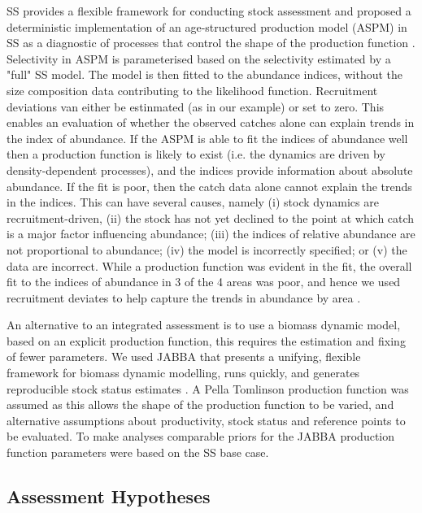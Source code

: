 \documentclass[12pt,halfline,a4paper,nonumbib]{ouparticle}
\begin{document}
SS provides a flexible framework for conducting stock assessment and \cite{maunder2015contemporary} proposed a deterministic implementation of an age-structured production model (ASPM) in SS as a diagnostic of processes that control the shape of the production function \parencite{carvalho2017can}. Selectivity in ASPM is parameterised based on the selectivity estimated by a "full" SS model. The model is then fitted to the abundance indices, without the size composition data contributing to the likelihood function. Recruitment deviations van either be estinmated (as in our example) or set to zero. This enables an evaluation of whether the observed catches alone can explain trends in the index of abundance. If the ASPM is able to fit the indices of abundance well then a production function is likely to exist (i.e. the dynamics are driven by density-dependent processes), and the indices provide information about absolute abundance. If the fit is poor, then the catch data alone cannot explain the trends in the indices. This can have several causes, namely (i) stock dynamics are recruitment-driven, (ii) the stock has not yet declined to the point at which catch is a major factor influencing abundance; (iii) the indices of relative abundance are not proportional to abundance;  (iv) the model is incorrectly specified; or (v) the data are incorrect. While a production function was evident in the fit, the overall fit to the indices of abundance in 3 of the 4 areas was poor, and hence we used recruitment deviates to help capture the trends in abundance by area \cite[see][]{minte2017get}.

An alternative to an integrated assessment is to use a biomass dynamic model, based on an explicit production function, this requires the estimation and fixing of fewer parameters. We used JABBA that presents a unifying, flexible framework for biomass dynamic modelling, runs quickly, and generates reproducible stock status estimates \parencite{winker2018jabba}. A Pella Tomlinson production function \parencite{pella1969generalized} was assumed as this allows the shape of the production function to be varied, and alternative assumptions about productivity, stock status and reference points to be evaluated. To make analyses comparable priors for the JABBA production function parameters were based on the SS base case. 

\subsection{Assessment Hypotheses}
\end{document}
